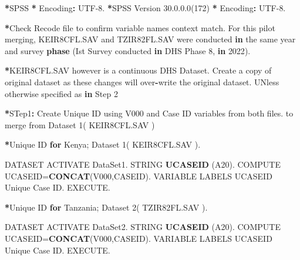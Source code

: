 \documentclass[
]{article}
\newenvironment{Shaded}{\begin{snugshade}}{\end{snugshade}}
\newcommand{\ControlFlowTok}[1]{\textcolor[rgb]{0.13,0.29,0.53}{\textbf{#1}}}
\newcommand{\DecValTok}[1]{\textcolor[rgb]{0.00,0.00,0.81}{#1}}
\newcommand{\FloatTok}[1]{\textcolor[rgb]{0.00,0.00,0.81}{#1}}
\newcommand{\FunctionTok}[1]{\textcolor[rgb]{0.13,0.29,0.53}{\textbf{#1}}}
\newcommand{\NormalTok}[1]{#1}
\newcommand{\OtherTok}[1]{\textcolor[rgb]{0.56,0.35,0.01}{#1}}
\newcommand{\SpecialCharTok}[1]{\textcolor[rgb]{0.81,0.36,0.00}{\textbf{#1}}}
\newcommand{\StringTok}[1]{\textcolor[rgb]{0.31,0.60,0.02}{#1}}
\begin{document}
\begin{Shaded}
\begin{Highlighting}[]
\SpecialCharTok{*}\NormalTok{SPSS}
\SpecialCharTok{*}\NormalTok{ Encoding}\SpecialCharTok{:}\NormalTok{ UTF}\FloatTok{{-}8.}
\SpecialCharTok{*}\NormalTok{SPSS Version }\DecValTok{30}\NormalTok{.}\DecValTok{0}\NormalTok{.}\FloatTok{0.0}\NormalTok{(}\DecValTok{172}\NormalTok{)}
\SpecialCharTok{*}\NormalTok{  Encoding}\SpecialCharTok{:}\NormalTok{ UTF}\FloatTok{{-}8.}


\SpecialCharTok{*}\NormalTok{Check Recode file to confirm  variable names context match. For this pilot merging, KEIR8CFL.SAV and TZIR82FL.SAV were conducted }\ControlFlowTok{in}\NormalTok{ the same year and survey }\FunctionTok{phase}\NormalTok{ (Ist Survey conducted }\ControlFlowTok{in}\NormalTok{ DHS Phase }\DecValTok{8}\NormalTok{, }\ControlFlowTok{in} \DecValTok{2022}\NormalTok{).}

\SpecialCharTok{*}\NormalTok{KEIR8CFL.SAV however is a continuous DHS Dataset. Create a copy of original dataset as these changes will over}\SpecialCharTok{{-}}\NormalTok{write the original dataset. UNless otherwise specified as }\ControlFlowTok{in}\NormalTok{ Step }\DecValTok{2}

\SpecialCharTok{*}\NormalTok{STep1}\SpecialCharTok{:}\NormalTok{ Create Unique ID using V000 and Case ID variables from both files. to merge from Dataset }\DecValTok{1}\NormalTok{( KEIR8CFL.SAV )}

\SpecialCharTok{*}\NormalTok{Unique ID }\ControlFlowTok{for}\NormalTok{ Kenya; Dataset }\DecValTok{1}\NormalTok{( KEIR8CFL.SAV ).}

\NormalTok{DATASET ACTIVATE DataSet1.}
\NormalTok{STRING  }\FunctionTok{UCASEID}\NormalTok{ (A20).}
\NormalTok{COMPUTE UCASEID}\OtherTok{=}\FunctionTok{CONCAT}\NormalTok{(V000,CASEID).}
\NormalTok{VARIABLE LABELS  UCASEID }\StringTok{\textquotesingle{}Unique Case ID\textquotesingle{}}\NormalTok{.}
\NormalTok{EXECUTE.}


\SpecialCharTok{*}\NormalTok{Unique ID }\ControlFlowTok{for}\NormalTok{ Tanzania; Dataset }\DecValTok{2}\NormalTok{( TZIR82FL.SAV ).}

\NormalTok{DATASET ACTIVATE DataSet2.}
\NormalTok{STRING  }\FunctionTok{UCASEID}\NormalTok{ (A20).}
\NormalTok{COMPUTE UCASEID}\OtherTok{=}\FunctionTok{CONCAT}\NormalTok{(V000,CASEID).}
\NormalTok{VARIABLE LABELS  UCASEID }\StringTok{\textquotesingle{}Unique Case ID\textquotesingle{}}\NormalTok{.}
\NormalTok{EXECUTE.}




\end{Highlighting}
\end{Shaded}
\end{document}

